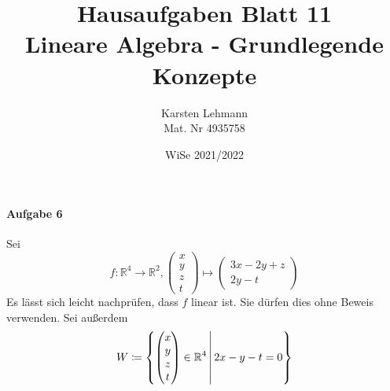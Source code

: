 \documentclass{scrreprt}
\author{Karsten Lehmann\\Mat. Nr 4935758}
\date{WiSe 2021/2022}
\title{Hausaufgaben Blatt 11\\Lineare Algebra - Grundlegende Konzepte}
\begin{document}
\paragraph{Aufgabe 6} Sei
\[
  f \colon \mathbb{R}^4 \to \mathbb{R}^2,
  \begin{pmatrix} x \\ y \\ z \\ t \end{pmatrix} \mapsto
  \begin{pmatrix} 3x - 2y + z \\ 2y - t \end{pmatrix}
\]
Es lässt sich leicht nachprüfen, dass $f$ linear ist.
Sie dürfen dies ohne Beweis verwenden.
Sei außerdem
\[
  W \coloneqq \qty{
    \begin{pmatrix} x \\ y \\ z \\ t \end{pmatrix} \in \mathbb{R}^4
    \,\middle|\, 2x - y - t = 0
  }
\]
\end{document}
